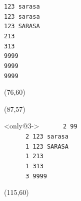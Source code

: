 \documentclass{beamer}
\begin{document}
\begin{frame}[fragile,t]
\begin{textblock}{35}
\begin{block}
    \verb:123 sarasa:\\
    \verb:123 sarasa:\\
    \verb:123 SARASA:\\
    \verb:213:\\
    \verb:313:\\
    \verb:9999:\\
    \verb:9999:\\
    \verb:9999:
    \vspace*{0.5ex}
    \end{block}
    \end{textblock}
    \begin{textblock}{35}(76,60)
    \end{textblock}
    \begin{textblock}{35}(87,57)
    \begin{block}<only@3->{\vspace*{-3ex}}
    \scriptsize
    \verb:      2 99:\\
    \verb:      2 123 sarasa:\\
    \verb:      1 123 SARASA:\\
    \verb:      1 213:\\
    \verb:      1 313:\\
    \verb:      3 9999:
    \vspace*{0.5ex}
    \end{block}
    \end{textblock}
    \begin{textblock}{35}(115,60)
    \end{textblock}
\end{frame}
\end{document}
